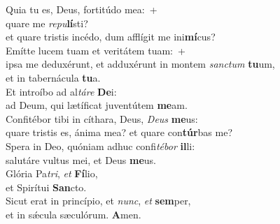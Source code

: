 \evenverse Quia tu es, Deus, fortitúdo mea:~+\\\evenverse  quare me \textit{re}\textit{pu}\textbf{lí}sti?~\*\\
\evenverse et quare tristis incédo, dum afflígit me ini\textbf{mí}cus?\\
\oddverse Emítte lucem tuam et veritátem tuam:~+\\
\oddverse  ipsa me deduxérunt, et adduxérunt in montem \textit{san}\textit{ctum} \textbf{tu}um,~\*\\
\oddverse et in tabernácula \textbf{tu}a.\\
\evenverse Et introíbo ad al\textit{tá}\textit{re} \textbf{De}i:~\*\\
\evenverse ad Deum, qui lætíficat juventútem \textbf{me}am.\\
\oddverse Confitébor tibi in cíthara, Deus, \textit{De}\textit{us} \textbf{me}us:~\*\\
\oddverse quare tristis es, ánima mea? et quare con\textbf{túr}bas me?\\
\evenverse Spera in Deo, quóniam adhuc confi\textit{té}\textit{bor} \textbf{il}li:~\*\\
\evenverse salutáre vultus mei, et Deus \textbf{me}us.\\
\oddverse Glória Pa\textit{tri}, \textit{et} \textbf{Fí}lio,~\*\\
\oddverse et Spirítui \textbf{San}cto.\\
\evenverse Sicut erat in princípio, et \textit{nunc}, \textit{et} \textbf{sem}per,~\*\\
\evenverse et in sǽcula sæculórum. \textbf{A}men.\\
